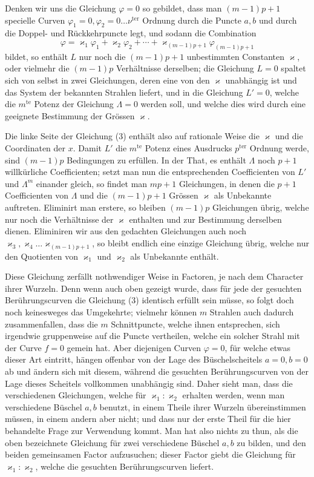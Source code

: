 \documentclass[10pt]{article}
\begin{document}
Denken wir uns die Gleichung \(\varphi=0\) so gebildet, dass man \((m-1)p+1\) specielle Curven \(\varphi_1=0,\varphi_2=0\ldots\nu^{\text{ter}}\) Ordnung durch die Puncte \(a,b\) und durch die Doppel- und Rückkehrpuncte legt, und sodann die Combination
\[
\varphi=\varkappa_1\varphi_1+\varkappa_2\varphi_2+\cdots+
\varkappa_{(m-1)p+1}\varphi_{(m-1)p+1}
\]
bildet, so enthält \(L\) nur noch die \((m-1)p+1\) unbestimmten Constanten \(\varkappa\), oder vielmehr die \((m-1)p\) Verhältnisse derselben; die Gleichung \(L=0\) spaltet sich von selbst in zwei Gleichungen, deren eine von den \(\varkappa\) unabhängig ist und das System der bekannten Strahlen liefert, und in die Gleichung \(L'=0\), welche die \(m^{\text{te}}\) Potenz der Gleichung \(\Lambda=0\) werden soll, und welche dies wird durch eine geeignete Bestimmung der Grössen \(\varkappa\).

Die linke Seite der Gleichung (3) enthält also auf rationale Weise die \(\varkappa\) und die Coordinaten der \(x\). Damit \(L'\) die \(m^{\text{te}}\) Potenz eines Ausdrucks \(p^{\text{ter}}\) Ordnung werde, sind \((m-1)p\) Bedingungen zu erfüllen. In der That, es enthält \(\Lambda\) noch \(p+1\) willkürliche Coefficienten; setzt man nun die entsprechenden Coefficienten von \(L'\) und \(\Lambda^m\) einander gleich, so findet man \(mp+1\) Gleichungen, in denen die \(p+1\) Coefficienten von \(\Lambda\) und die \((m-1)p+1\) Grössen \(\varkappa\) als Unbekannte auftreten. Eliminirt man erstere, so bleiben \((m-1)p\) Gleichungen übrig, welche nur noch die Verhältnisse der \(\varkappa\) enthalten und zur Bestimmung derselben dienen. Eliminiren wir aus den gedachten Gleichungen auch noch \(\varkappa_3,\varkappa_4\ldots\varkappa_{(m-1)p+1}\), so bleibt endlich eine einzige Gleichung übrig, welche nur den Quotienten von \(\varkappa_1\) und \(\varkappa_2\) als Unbekannte enthält.

Diese Gleichung zerfällt nothwendiger Weise in Factoren, je nach dem Character ihrer Wurzeln. Denn wenn auch oben gezeigt wurde, dass für jede der gesuchten Berührungscurven die Gleichung (3) identisch erfüllt sein müsse, so folgt doch noch keinesweges das Umgekehrte; vielmehr können \(m\) Strahlen auch dadurch zusammenfallen, dass die \(m\) Schnittpuncte, welche ihnen entsprechen, sich irgendwie gruppenweise auf die Puncte vertheilen, welche ein solcher Strahl mit der Curve \(f=0\) gemein hat. Aber diejenigen Curven \(\varphi=0\), für welche etwas dieser Art eintritt, hängen offenbar von der Lage des Büschelscheitels \(a=0,b=0\) ab und ändern sich mit diesem, während die gesuchten Berührungscurven von der Lage dieses Scheitels vollkommen unabhängig sind. Daher sieht man, dass die verschiedenen Gleichungen, welche für \(\varkappa_1:\varkappa_2\) erhalten werden, wenn man verschiedene Büschel \(a,b\) benutzt, in einem Theile ihrer Wurzeln übereinstimmen müssen, in einem andern aber nicht; und dass nur der erste Theil für die hier behandelte Frage zur Verwendung kommt. Man hat also nichts zu thun, als die oben bezeichnete Gleichung für zwei verschiedene Büschel \(a,b\) zu bilden, und den beiden gemeinsamen Factor aufzusuchen; dieser Factor giebt die Gleichung für \(\varkappa_1:\varkappa_2\), welche die gesuchten Berührungscurven liefert.
\end{document}
